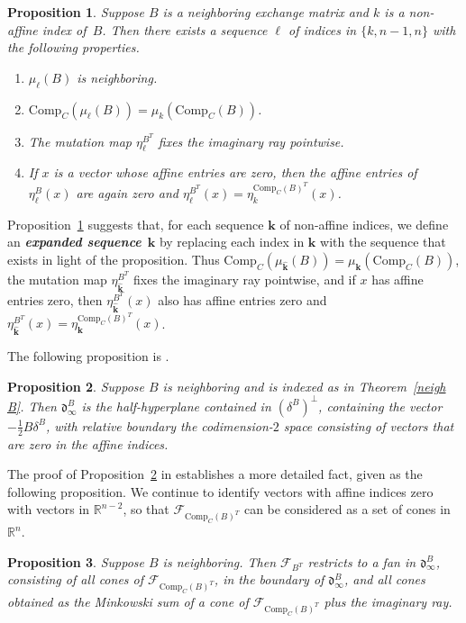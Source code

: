\documentclass{amsart}
\newtheorem{proposition}{Proposition}[section]
\theoremstyle{definition}
\theoremstyle{remark}
\numberwithin{equation}{section}
\newcommand{\newword}[1]{\textbf{\emph{#1}}}
\newcommand{\reals}{\mathbb R}
\newcommand{\set}[1]{{\lbrace #1 \rbrace}}
\newcommand{\F}{{\mathcal F}}
\newcommand{\0}{{\mathbf{0}}}
\newcommand{\Comp}{\mathrm{Comp}_C}
\newcommand{\kk}{{\boldsymbol{k}}}
\renewcommand{\ll}{{\boldsymbol\ell}}
\renewcommand{\d}{{\mathfrak d}}
\begin{document}
\begin{proposition}\label{nice mut}
Suppose $B$ is a neighboring exchange matrix and $k$ is a non-affine index of~$B$.
Then there exists a sequence $\ll$ of indices in $\set{k,n-1,n}$ with the following properties.
\begin{enumerate}[label=\bf\arabic*., ref=\arabic*]
\item
$\mu_\ll(B)$ is neighboring.
\item
$\Comp(\mu_\ll(B))=\mu_k(\Comp(B))$.
\item
The mutation map $\eta^{B^T}_\ll$ fixes the imaginary ray pointwise.
\item
If $x$ is a vector whose affine entries are zero, then the affine entries of $\eta^B_\ll(x)$ are again zero and $\eta^{B^T}_\ll(x)=\eta^{\Comp(B)^T}_k(x)$.
\end{enumerate}
\end{proposition}

Proposition~\ref{nice mut} suggests that, for each sequence $\kk$ of non-affine indices, we define an \newword{expanded sequence}~$\widehat\kk$ by replacing each index in $\kk$ with the sequence that exists in light of the proposition.
Thus $\Comp(\mu_{\widehat\kk}(B))=\mu_\kk(\Comp(B))$, the mutation map $\eta^{B^T}_{\widehat\kk}$ fixes the imaginary ray pointwise, and if $x$ has affine entries zero, then $\eta^{B^T}_{\widehat\kk}(x)$ also has affine entries zero and $\eta^{B^T}_{\widehat\kk}(x)=\eta^{\Comp(B)^T}_\kk(x)$.

The following proposition is \cite[Proposiion~4.54]{affdomreg}.

\begin{proposition}\label{neigh im wall}
Suppose $B$ is neighboring and is indexed as in Theorem~\ref{neigh B}.
Then $\d^B_\infty$ is the half-hyperplane contained in $(\delta^B)^\perp$, containing the vector $-\frac12B\delta^B$, with relative boundary the codimension-$2$ space consisting of vectors that are zero in the affine indices.
\end{proposition}

The proof of Proposition~\ref{neigh im wall} in \cite{affdomreg} establishes a more detailed fact, given as the following proposition.  
We continue to identify vectors with affine indices zero with vectors in $\reals^{n-2}$, so that $\F_{\Comp(B)^T}$ can be considered as a set of cones in $\reals^n$.

\begin{proposition}\label{neigh im cone}
Suppose $B$ is neighboring.
Then $\F_{B^T}$ restricts to a fan in $\d^B_\infty$, consisting of all cones of $\F_{\Comp(B)^T}$, in the boundary of $\d^B_\infty$, and all cones obtained as the Minkowski sum of a cone of $\F_{\Comp(B)^T}$ plus the imaginary ray.
\end{proposition}
\end{document}
